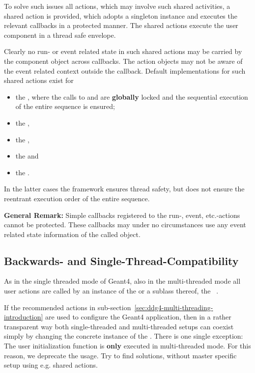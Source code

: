 \noindent
To solve such issues all actions, which may involve such shared 
activities, a shared action is provided, which adopts a singleton
instance and executes the relevant callbacks in a protected manner.
The shared actions execute the user component in a thread safe envelope.

\noindent
Clearly no run- or event related state in such shared actions may be
carried by the component object across callbacks. The action objects
may not be aware of the event related context outside the callback.
Default implementations for such shared actions exist for
\begin{itemize}\itemcompact
\item the {}, where the calls to 
        {} and {}
        are {\bf{globally}} locked and the sequential execution of 
        the entire sequence is ensured;
\item the {},
\item the {},
\item the {} and
\item the {}.
\end{itemize}
In the latter cases the framework ensures thread safety, but does 
not ensure the reentrant execution order of the entire sequence.

\noindent
{\bf{General Remark:}}
\noindent
Simple callbacks registered to the run-, event, etc.-actions cannot 
be protected. These callbacks may under no circumstances use any 
event related state information of the called object.

\subsection{Backwards- and Single-Thread-Compatibility}
\label{sec:ddg4-multi-threading-backwards}
\noindent
As in the single threaded mode of Geant4, also in the multi-threaded
mode all user actions are called by an instance of the {}
or a sublass thereof, the {}~\cite{bib:Geant4-multi-threading}.

\noindent
If the recommended actions in sub-section~\ref{sec:ddg4-multi-threading-introduction}
are used to configure the Geant4 application, then in a rather transparent
way both single-threaded and multi-threaded setups can coexist simply by 
changing the concrete instance of the {}. There is one
single exception: The user initialization function
{} is {\bf{only}} executed
in multi-threaded mode. For this reason, we deprecate the usage. Try
to find solutions, without master specific setup using e.g. shared actions.

